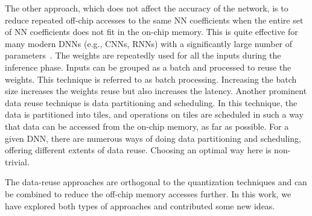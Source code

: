 \documentclass[a4paper,10pt]{article}
\begin{document}
The other approach, which does not affect the accuracy of the network, is to reduce repeated off-chip accesses to the same NN coefficients when the entire set of NN coefficients does not fit in the on-chip memory. This is quite effective for many modern DNNs (e.g., CNNs, RNNs) with a significantly large number of parameters~\cite{zhang2015optimizing,Li2018SmartShuttleOO,que2019efficient,park2020time}. The weights are repeatedly used for all the inputs during the inference phase. Inputs can be grouped as a batch and processed to reuse the weights. This technique is referred to as batch processing. Increasing the batch size increases the weights reuse but also increases the latency. Another prominent data reuse technique is data partitioning and scheduling. In this technique, the data is partitioned into tiles, and operations on tiles are scheduled in such a way that data can be accessed from the on-chip memory, as far as possible. For a given DNN, there are numerous ways of doing data partitioning and scheduling, offering different extents of data reuse. Choosing an optimal way here is non-trivial.

The data-reuse approaches are orthogonal to the quantization techniques and can be combined to reduce the off-chip memory accesses further. In this work, we have explored both types of approaches and contributed some new ideas.
\end{document}
